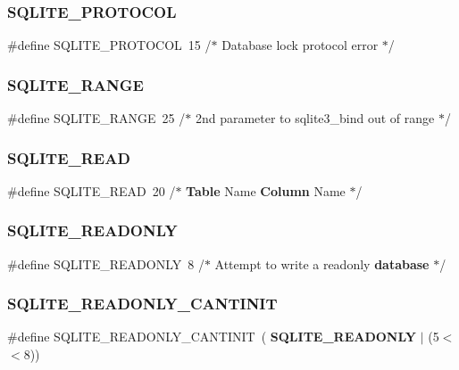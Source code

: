 \mbox{\label{sqlite3_8h_a9d36e4a7294f4df777bd4520489190c5}} 
\subsubsection{SQLITE\_PROTOCOL}
{\footnotesize\ttfamily \#define S\+Q\+L\+I\+T\+E\+\_\+\+P\+R\+O\+T\+O\+C\+OL~15   /$\ast$ Database lock protocol error $\ast$/}

\mbox{\label{sqlite3_8h_a79e99f6d1d284441d8f97f12946cba3d}} 
\subsubsection{SQLITE\_RANGE}
{\footnotesize\ttfamily \#define S\+Q\+L\+I\+T\+E\+\_\+\+R\+A\+N\+GE~25   /$\ast$ 2nd parameter to sqlite3\+\_\+bind out of range $\ast$/}

\mbox{\label{sqlite3_8h_a3f1a55857de47148723f789496f8731b}} 
\subsubsection{SQLITE\_READ}
{\footnotesize\ttfamily \#define S\+Q\+L\+I\+T\+E\+\_\+\+R\+E\+AD~20   /$\ast$ \textbf{ Table} Name      \textbf{ Column} Name     $\ast$/}

\mbox{\label{sqlite3_8h_a1ee0a0db43018cda5ee64cf78abbd675}} 
\subsubsection{SQLITE\_READONLY}
{\footnotesize\ttfamily \#define S\+Q\+L\+I\+T\+E\+\_\+\+R\+E\+A\+D\+O\+N\+LY~8   /$\ast$ Attempt to write a readonly \textbf{ database} $\ast$/}

\mbox{\label{sqlite3_8h_a4b34c0318d44c012193535040b97e8d6}} 
\subsubsection{SQLITE\_READONLY\_CANTINIT}
{\footnotesize\ttfamily \#define S\+Q\+L\+I\+T\+E\+\_\+\+R\+E\+A\+D\+O\+N\+L\+Y\+\_\+\+C\+A\+N\+T\+I\+N\+IT~(\textbf{ S\+Q\+L\+I\+T\+E\+\_\+\+R\+E\+A\+D\+O\+N\+LY} $\vert$ (5$<$$<$8))}

